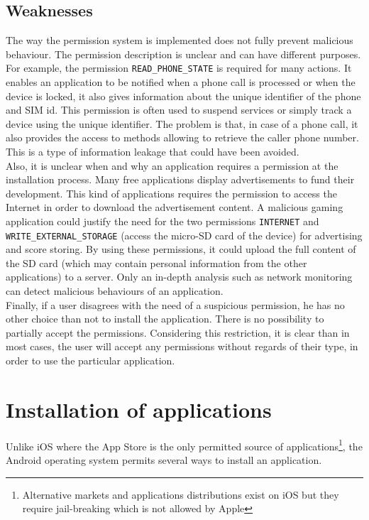 \subsection{Weaknesses}

The way the permission system is implemented does not fully prevent malicious behaviour.
The permission description is unclear and can have different purposes.
For example, the permission \texttt{READ\_PHONE\_STATE} is required for many actions.
It enables an application to be notified when a phone call is processed or when the device is locked, it also gives information about the unique identifier of the phone and SIM id.
This permission is often used to suspend services or simply track a device using the unique identifier.
The problem is that, in case of a phone call, it also provides the access to methods allowing to retrieve the caller phone number.
This is a type of information leakage that could have been avoided.\\

Also, it is unclear when and why an application requires a permission at the installation process.
Many free applications display advertisements to fund their development.
This kind of applications requires the permission to access the Internet in order to download the advertisement content.
A malicious gaming application could justify the need for the two permissions \texttt{INTERNET} and \texttt{WRITE\_EXTERNAL\_STORAGE} (access the micro-SD card of the device) for advertising and score storing.
By using these permissions, it could upload the full content of the SD card (which may contain personal information from the other applications) to a server.
Only an in-depth analysis such as network monitoring can detect malicious behaviours of an application.\\

Finally, if a user disagrees with the need of a suspicious permission, he has no other choice than not to install the application.
There is no possibility to partially accept the permissions.
Considering this restriction, it is clear than in most cases, the user will accept any permissions without regards of their type, in order to use the particular application.

\section{Installation of applications}

Unlike iOS where the App Store is the only permitted source of applications\footnote{Alternative markets and applications distributions exist on iOS but they require jail-breaking which is not allowed by Apple}, the Android operating system permits several ways to install an application.

